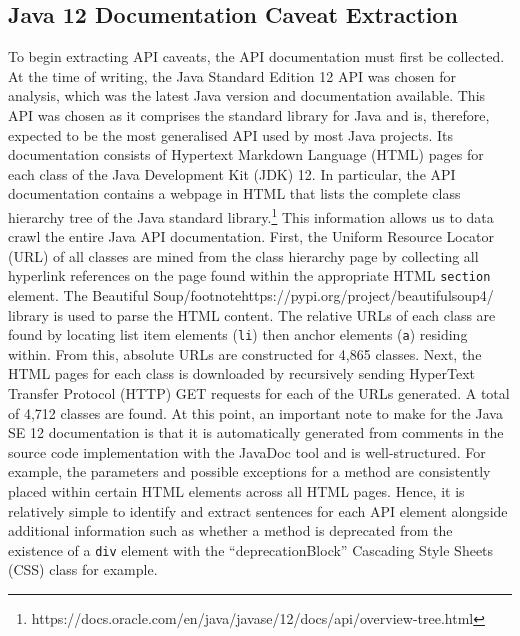 \subsection{Java 12 Documentation Caveat Extraction}
\label{subsec:info-caveat-extract}
To begin extracting API caveats, the API documentation must first be collected. At the time of writing, the Java Standard Edition 12 API was chosen for analysis, which was the latest Java version and documentation available. This API was chosen as it comprises the standard library for Java and is, therefore, expected to be the most generalised API used by most Java projects. Its documentation consists of Hypertext Markdown Language (HTML) pages for each class of the Java Development Kit (JDK) 12. In particular, the API documentation contains a webpage in HTML that lists the complete class hierarchy tree of the Java standard library.\footnote{https://docs.oracle.com/en/java/javase/12/docs/api/overview-tree.html} This information allows us to data crawl the entire Java API documentation. First, the Uniform Resource Locator (URL) of all classes are mined from the class hierarchy page by collecting all hyperlink references on the page found within the appropriate HTML \lstinline{section} element. The Beautiful Soup/footnote{https://pypi.org/project/beautifulsoup4/} library is used to parse the HTML content. The relative URLs of each class are found by locating list item elements (\lstinline{li}) then anchor elements (\lstinline{a}) residing within. From this, absolute URLs are constructed for 4,865 classes. Next, the HTML pages for each class is downloaded by recursively sending HyperText Transfer Protocol (HTTP) GET requests for each of the URLs generated. A total of 4,712 classes are found. At this point, an important note to make for the Java SE 12 documentation is that it is automatically generated from comments in the source code implementation with the JavaDoc tool and is well-structured. For example, the parameters and possible exceptions for a method are consistently placed within certain HTML elements across all HTML pages. Hence, it is relatively simple to identify and extract sentences for each API element alongside additional information such as whether a method is deprecated from the existence of a \lstinline{div} element with the ``deprecationBlock'' Cascading Style Sheets (CSS) class for example.\bigbreak

